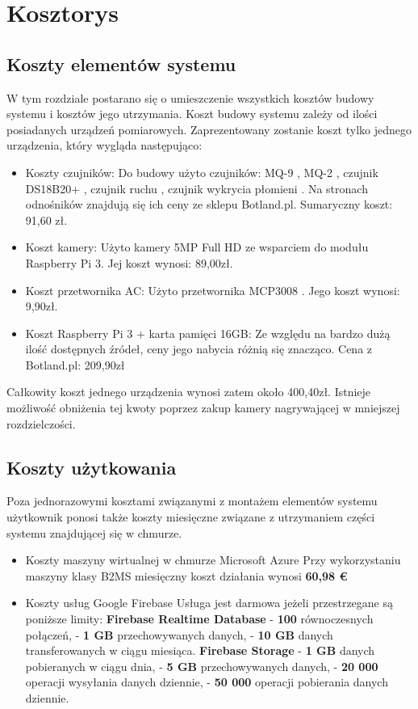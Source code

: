 \chapter{Kosztorys}

\section{Koszty elementów systemu}
W tym rozdziale postarano się o umieszczenie wszystkich kosztów budowy systemu i kosztów jego utrzymania. Koszt budowy systemu zależy od ilości posiadanych urządzeń pomiarowych. Zaprezentowany zostanie koszt tylko jednego urządzenia, który wygląda następująco:
\begin{itemize}
\item Koszty czujników:
Do budowy użyto czujników: MQ-9 \cite{specyfikacjaMQ-9}, MQ-2 \cite{specyfikacjaMQ-2}, czujnik DS18B20+ \cite{specyfikacjaTemp}, czujnik ruchu \cite{pir}, czujnik wykrycia płomieni \cite {specyfikacjaFlame}. Na stronach odnośników znajdują się ich ceny ze sklepu Botland.pl. Sumaryczny koszt: 91,60 zł.
\item Koszt kamery:
Użyto kamery 5MP Full HD ze wsparciem do modułu Raspberry Pi 3. Jej koszt wynosi: 89,00zł.
\item Koszt przetwornika AC:
Użyto przetwornika MCP3008 \cite{specyfikacjaAC}. Jego koszt wynosi: 9,90zł.
\item Koszt Raspberry Pi 3 + karta pamięci 16GB: 
Ze względu na bardzo dużą ilość dostępnych źródeł, ceny jego nabycia różnią się znacząco. Cena z Botland.pl: 209,90zł
\end{itemize}
Całkowity koszt jednego urządzenia wynosi zatem około 400,40zł. Istnieje możliwość obniżenia tej kwoty poprzez zakup kamery nagrywającej w mniejszej rozdzielczości. 

\section{Koszty użytkowania}
Poza jednorazowymi kosztami związanymi z montażem elementów systemu użytkownik ponosi także koszty miesięczne związane z utrzymaniem części systemu znajdującej się w chmurze.
\begin{itemize}
    \item Koszty maszyny wirtualnej w chmurze Microsoft Azure \newline
    Przy wykorzystaniu maszyny klasy B2MS miesięczny koszt działania wynosi \textbf{60,98 €}
    \item Koszty usług Google Firebase\newline
    Usługa jest darmowa jeżeli przestrzegane są poniższe limity:
    \subitem \textbf{Firebase Realtime Database}
    \subsubitem - \textbf{100} równoczesnych połączeń,
    \subsubitem - \textbf{1 GB} przechowywanych danych,
    \subsubitem - \textbf{10 GB} danych transferowanych w ciągu miesiąca.
    \subitem \textbf{Firebase Storage}
    \subsubitem - \textbf{1 GB} danych pobieranych w ciągu dnia,
    \subsubitem - \textbf{5 GB} przechowywanych danych,
    \subsubitem - \textbf{20 000} operacji wysyłania danych dziennie,
    \subsubitem - \textbf{50 000} operacji pobierania danych dziennie.
\end{itemize}